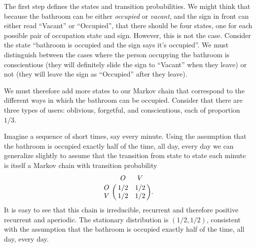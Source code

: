 \documentclass[12pt]{article}
\begin{document}
The first step defines the states and transition probabilities.  We
might think that because the bathroom can be either \emph{occupied} or
\emph{vacant}, and the sign in front can either read ``Vacant'' or
``Occupied'', that there should be four states, one for each possible
pair of occupation state and sign.  However, this is not the case.
Consider the state ``bathroom is occupied and the sign says it’s
occupied''.  We must distinguish between the cases where the person
occupying the bathroom is conscientious (they will definitely slide the
sign to ``Vacant'' when they leave) or not (they will leave the sign as
``Occupied'' after they leave).

We must therefore add more states to our Markov chain that correspond to
the different ways in which the bathroom can be occupied.  Consider that
there are three types of users:  oblivious, forgetful, and
conscientious, each of proportion \( 1/3 \).

Imagine a sequence of short times, say every minute.  Using the
assumption that the bathroom is occupied exactly half of the time, all
day, every day we can generalize slightly to assume that the transition
from state to state each minute is itself a Markov chain with transition
probability
\[
    \bordermatrix{ & O & V \cr
    O & 1/2 & 1/2 \cr
    V & 1/2 & 1/2 }.
\] It is easy to see that this chain is irreducible, recurrent and
therefore positive recurrent and aperiodic.  The stationary distribution
is \( (1/2, 1/2) \), consistent with the assumption that the bathroom is
occupied exactly half of the time, all day, every day.
\end{document}
